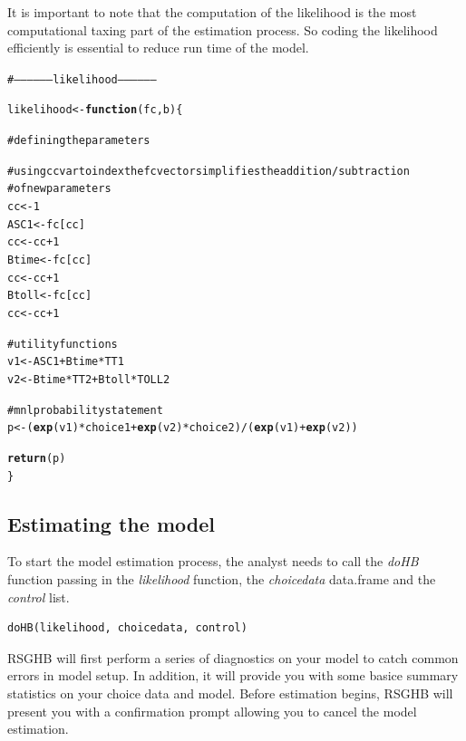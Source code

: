 \documentclass{article}\usepackage{graphicx, color}
\makeatletter
\newcommand{\hlfunctioncall}[1]{\textcolor[rgb]{0.501960784313725,0,0.329411764705882}{\textbf{#1}}}%
\newcommand{\hlcomment}[1]{\textcolor[rgb]{0.180392156862745,0.6,0.341176470588235}{#1}}%
\newenvironment{kframe}{%
 \def\at@end@of@kframe{}%
 \ifinner\ifhmode%
  \def\at@end@of@kframe{\end{minipage}}%
  \begin{minipage}{\columnwidth}%
 \fi\fi%
 \def\FrameCommand##1{\hskip\@totalleftmargin \hskip-\fboxsep
 \colorbox{shadecolor}{##1}\hskip-\fboxsep
     \hskip-\linewidth \hskip-\@totalleftmargin \hskip\columnwidth}%
 \MakeFramed {\advance\hsize-\width
   \@totalleftmargin\z@ \linewidth\hsize
   \@setminipage}}%
 {\par\unskip\endMakeFramed%
 \at@end@of@kframe}
\newenvironment{knitrout}{}{} %
\makeatother
\begin{document}
It is important to note that the computation of the likelihood is the most computational taxing part of the estimation process. So coding the likelihood efficiently is essential to reduce run time of the model.


\begin{knitrout}
\color{fgcolor}\begin{kframe}
\begin{alltt}

\hlcomment{# ------------------ likelihood ------------------}

likelihood <- \hlfunctioncall{function}(fc, b) \{
    
\hlcomment{    # defining the parameters}
    
\hlcomment{    # using cc var to index the fc vector simplifies the addition/subtraction}
\hlcomment{    # of new parameters}
    cc <- 1
    ASC1 <- fc[cc]
    cc <- cc + 1
    Btime <- fc[cc]
    cc <- cc + 1
    Btoll <- fc[cc]
    cc <- cc + 1
    
\hlcomment{    # utility functions}
    v1 <- ASC1 + Btime * TT1
    v2 <- Btime * TT2 + Btoll * TOLL2
    
\hlcomment{    # mnl probability statement}
    p <- (\hlfunctioncall{exp}(v1) * choice1 + \hlfunctioncall{exp}(v2) * choice2)/(\hlfunctioncall{exp}(v1) + \hlfunctioncall{exp}(v2))
    
    \hlfunctioncall{return}(p)
\}
\end{alltt}
\end{kframe}
\end{knitrout}


\subsection*{Estimating the model}

To start the model estimation process, the analyst needs to call the \emph{doHB} function passing in the \emph{likelihood} function, the \emph{choicedata} data.frame and the \emph{control} list. 

\begin{verbatim}
doHB(likelihood, choicedata, control)
\end{verbatim}

RSGHB will first perform a series of diagnostics on your model to catch common errors in model setup. In addition, it will provide you with some basice summary statistics on your choice data and model. Before estimation begins, RSGHB will present you with a confirmation prompt allowing you to cancel the model estimation.
\end{document}
